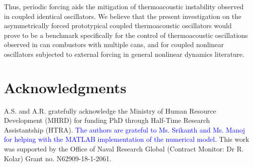 \documentclass[%
preprint,
 amsmath,amssymb,
 aps,
 pra,
]{revtex4-2}
\begin{document}
Thus, periodic forcing aids the mitigation of thermoacoustic instability observed in coupled identical oscillators. We believe that the present investigation on the asymmetrically forced prototypical coupled thermoacoustic oscillators would prove to be a benchmark specifically for the control of thermoacoustic oscillations observed in can combustors with multiple cans, and for coupled nonlinear oscillators subjected to external forcing in general nonlinear dynamics literature. 

\section*{Acknowledgments}
A.S. and A.R. gratefully acknowledge the Ministry of Human Resource Development (MHRD) for funding PhD through Half-Time Research Assistantship (HTRA). \textcolor{blue}{The authors are grateful to Ms. Srikanth and Ms. Manoj for helping with the MATLAB implementation of the numerical model.} This work was supported by the Office of Naval Research Global (Contract Monitor: Dr R. Kolar) Grant no. N62909-18-1-2061.


\end{document}
